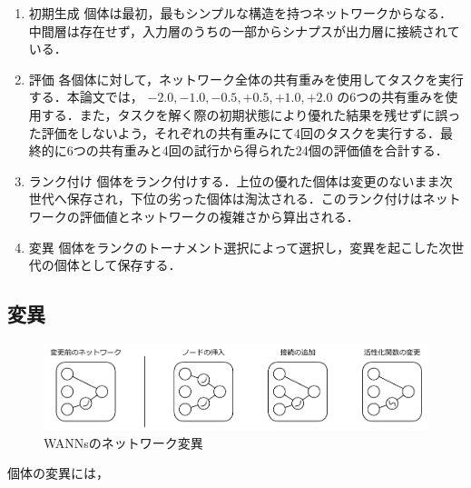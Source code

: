 \begin{enumerate}
    \item 初期生成
    個体は最初，最もシンプルな構造を持つネットワークからなる．中間層は存在せず，入力層のうちの一部からシナプスが出力層に接続されている．

    \item 評価
    各個体に対して，ネットワーク全体の共有重みを使用してタスクを実行する．本論文では， $ -2.0, -1.0, -0.5, +0.5, +1.0, +2.0 $ の6つの共有重みを使用する．また，タスクを解く際の初期状態により優れた結果を残せずに誤った評価をしないよう，それぞれの共有重みにて4回のタスクを実行する．最終的に6つの共有重みと4回の試行から得られた24個の評価値を合計する．

    \item ランク付け
    個体をランク付けする．上位の優れた個体は変更のないまま次世代へ保存され，下位の劣った個体は淘汰される．このランク付けはネットワークの評価値とネットワークの複雑さから算出される．

    \item 変異
    個体をランクのトーナメント選択\cite{遺伝的アルゴリズム}によって選択し，変異を起こした次世代の個体として保存する．
\end{enumerate}

\subsection{変異}

\begin{figure}[h]
    \begin{center}
        \includegraphics[scale=0.8]{img/vary.pdf}
        \caption{WANNsのネットワーク変異}
    \end{center}
\end{figure}

個体の変異には，
